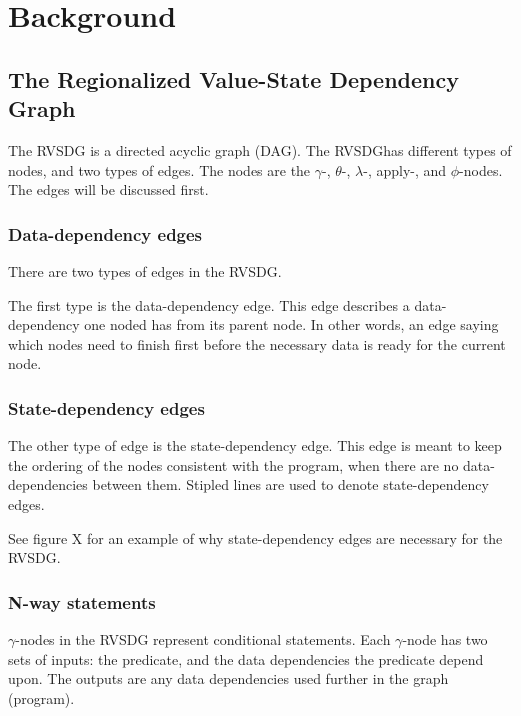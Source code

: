 
\section{Background}
\label{background}

\subsection{The Regionalized Value-State Dependency Graph}
\label{background:RVSDG}

The RVSDG is a directed acyclic graph (DAG). The RVSDGhas different types of
nodes, and two types of edges. The nodes are the $\gamma$-, $\theta$-,
$\lambda$-, apply-, and $\phi$-nodes. The edges will be discussed first.

\subsubsection{Data-dependency edges}

There are two types of edges in the RVSDG.

The first type is the data-dependency edge. This edge describes a data-
dependency one noded has from its parent node. In other words, an edge saying
which nodes need to finish first before the necessary data is ready for the
current node.

\subsubsection{State-dependency edges}

The other type of edge is the state-dependency edge. This edge is meant to keep
the ordering of the nodes consistent with the program, when there are no data-
dependencies between them. Stipled lines are used to denote state-dependency
edges.

See figure X for an example of why state-dependency edges are
necessary for the RVSDG.

\subsubsection{N-way statements}

\textit{$\gamma$}-nodes in the RVSDG represent conditional statements. Each
$\gamma$-node has two sets of inputs: the predicate, and the data dependencies
the predicate depend upon. The outputs are any data dependencies used further in
the graph (program).

